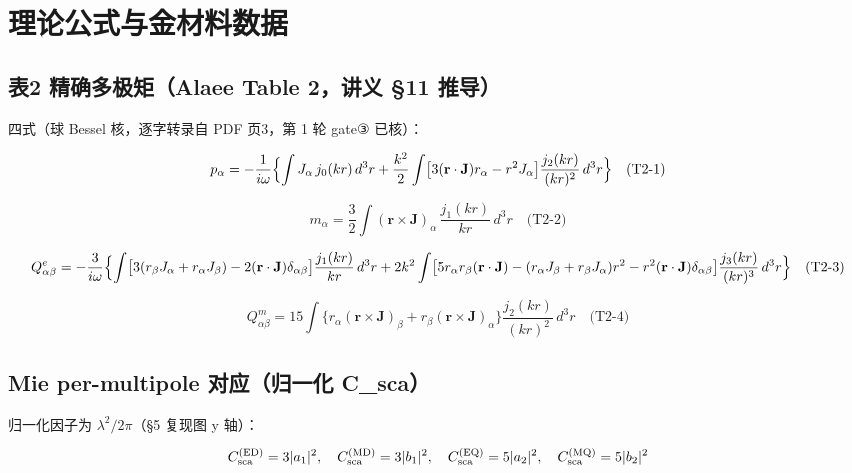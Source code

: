 \section{理论公式与金材料数据}

\subsection{表2 精确多极矩（Alaee Table 2，讲义 §11 推导）}

四式（球 Bessel 核，逐字转录自 PDF 页3，第 1 轮 gate③ 已核）：

\begin{equation}
p_\alpha = -\frac{1}{i\omega}\Bigl\{\int J_\alpha\,j_0(kr)\,d^3r
  + \frac{k^2}{2}\int\bigl[3(\mathbf{r}\cdot\mathbf{J})r_\alpha - r^2J_\alpha\bigr]\frac{j_2(kr)}{(kr)^2}\,d^3r\Bigr\} \quad \text{(T2-1)}
\end{equation}

\begin{equation}
m_\alpha = \frac32\int(\mathbf{r}\times\mathbf{J})_\alpha\,\frac{j_1(kr)}{kr}\,d^3r \quad \text{(T2-2)}
\end{equation}

\begin{equation}
Q^e_{\alpha\beta} = -\frac{3}{i\omega}\Bigl\{
  \int\bigl[3(r_\beta J_\alpha + r_\alpha J_\beta) - 2(\mathbf{r}\cdot\mathbf{J})\delta_{\alpha\beta}\bigr]\frac{j_1(kr)}{kr}\,d^3r
  + 2k^2\int\bigl[5r_\alpha r_\beta(\mathbf{r}\cdot\mathbf{J}) - (r_\alpha J_\beta + r_\beta J_\alpha)r^2 - r^2(\mathbf{r}\cdot\mathbf{J})\delta_{\alpha\beta}\bigr]\frac{j_3(kr)}{(kr)^3}\,d^3r
\Bigr\} \quad \text{(T2-3)}
\end{equation}

\begin{equation}
Q^m_{\alpha\beta} = 15\int\bigl\{r_\alpha(\mathbf{r}\times\mathbf{J})_\beta + r_\beta(\mathbf{r}\times\mathbf{J})_\alpha\bigr\}\frac{j_2(kr)}{(kr)^2}\,d^3r \quad \text{(T2-4)}
\end{equation}

\subsection{Mie per-multipole 对应（归一化 C\_sca）}

归一化因子为 $\lambda^2/2\pi$（§5 复现图 y 轴）：

\begin{equation}
C_{\rm sca}^{(\rm ED)} = 3|a_1|^2,\quad
C_{\rm sca}^{(\rm MD)} = 3|b_1|^2,\quad
C_{\rm sca}^{(\rm EQ)} = 5|a_2|^2,\quad
C_{\rm sca}^{(\rm MQ)} = 5|b_2|^2
\end{equation}

